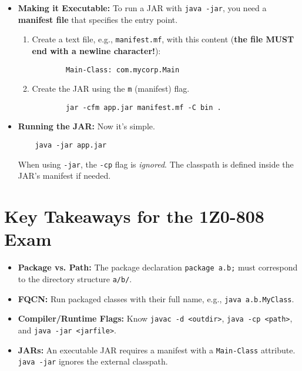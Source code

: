 \documentclass[12pt]{article}
\begin{document}
\begin{enumerate}[label=(\arabic*)]
\begin{itemize}
    \item \textbf{Making it Executable:} To run a JAR with \texttt{java -jar}, you need a \textbf{manifest file} that specifies the entry point.
    \begin{enumerate}
        \item Create a text file, e.g., \texttt{manifest.mf}, with this content (\textbf{the file MUST end with a newline character!}):
        \begin{verbatim}
        Main-Class: com.mycorp.Main
        \end{verbatim}
        \item Create the JAR using the \texttt{m} (manifest) flag.
        \begin{verbatim}
        jar -cfm app.jar manifest.mf -C bin .
        \end{verbatim}
    \end{enumerate}
    \item \textbf{Running the JAR:} Now it's simple.
    \begin{verbatim}
    java -jar app.jar
    \end{verbatim}
    When using \texttt{-jar}, the \texttt{-cp} flag is \textit{ignored}. The classpath is defined inside the JAR's manifest if needed.
\end{itemize}

\section{Key Takeaways for the 1Z0-808 Exam}
\begin{itemize}
    \item \textbf{Package vs. Path:} The package declaration \texttt{package a.b;} must correspond to the directory structure \texttt{a/b/}.
    \item \textbf{FQCN:} Run packaged classes with their full name, e.g., \texttt{java a.b.MyClass}.
    \item \textbf{Compiler/Runtime Flags:} Know \texttt{javac -d <outdir>}, \texttt{java -cp <path>}, and \texttt{java -jar <jarfile>}.
    \item \textbf{JARs:} An executable JAR requires a manifest with a \texttt{Main-Class} attribute. \texttt{java -jar} ignores the external classpath.
\end{itemize}
\end{enumerate}
\end{document}
